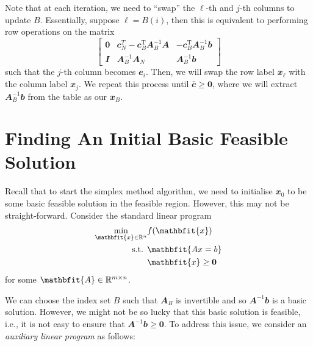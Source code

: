 \documentclass[math, code]{amznotes}
\theoremstyle{remark}
\begin{document}
Note that at each iteration, we need to ``swap'' the $\ell$-th and $j$-th columns to update $B$. Essentially, suppose $\ell = B(i)$, then this is equivalent to performing row operations on the matrix 
\begin{equation*}
    \begin{bmatrix}
        \mathbf{0} & \mathbfit{c}_N^{T} - \mathbfit{c}_B^{\mathrm{T}}\mathbfit{A}_B^{-1}\mathbfit{A} & -\mathbfit{c}_B^{\mathrm{T}}\mathbfit{A}_B^{-1}\mathbfit{b} \\
        \mathbfit{I} & \mathbfit{A}_B^{-1}\mathbfit{A}_N & \mathbfit{A}_B^{-1}\mathbfit{b}
    \end{bmatrix}
\end{equation*}
such that the $j$-th column becomes $\mathbfit{e}_{i}$. Then, we will swap the row label $\mathbfit{x}_{\ell}$ with the column label $\mathbfit{x}_j$. We repeat this process until $\mathbfit{\bar{c}} \geq \mathbf{0}$, where we will extract $\mathbfit{A}_B^{-1}\mathbfit{b}$ from the table as our $\mathbfit{x}_B$.
\section{Finding An Initial Basic Feasible Solution}
Recall that to start the simplex method algorithm, we need to initialise $\mathbfit{x}_0$ to be some basic feasible solution in the feasible region. However, this may not be straight-forward. Consider the standard linear program
\begin{align*}
    \min_{\mathbfit{x} \in \R^n} & f(\mathbfit{x}) \\
    \textrm{s.t. } & \mathbfit{Ax = b} \\
    & \mathbfit{x} \geq \mathbf{0}
\end{align*}
for some $\mathbfit{A} \in \R^{m \times n}$.

We can choose the index set $B$ such that $\mathbfit{A}_B$ is invertible and so $\mathbfit{A}^{-1}\mathbfit{b}$ is a basic solution. However, we might not be so lucky that this basic solution is feasible, i.e., it is not easy to ensure that $\mathbfit{A}^{-1}\mathbfit{b} \geq \mathbf{0}$. To address this issue, we consider an \textit{auxiliary linear program} as follows:
\end{document}
